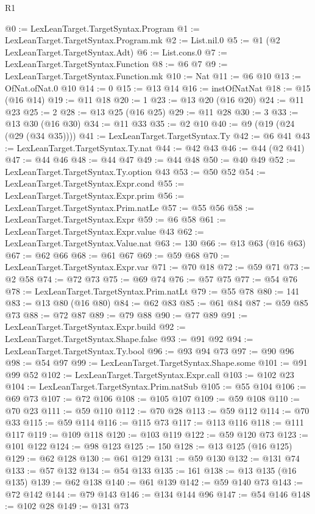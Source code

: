 \begin{lexlean}{R1}
\begin{coremodule}
@0 := LexLeanTarget.TargetSyntax.Program
@1 := LexLeanTarget.TargetSyntax.Program.mk
@2 := List.nil.{0}
@5 := @1 (@2 LexLeanTarget.TargetSyntax.Adt)
@6 := List.cons.{0}
@7 := LexLeanTarget.TargetSyntax.Function
@8 := @6 @7
@9 := LexLeanTarget.TargetSyntax.Function.mk
@10 := Nat
@11 := @6 @10
@13 := OfNat.ofNat.{0} @10
@14 := 0
@15 := @13 @14
@16 := instOfNatNat
@18 := @15 (@16 @14)
@19 := @11 @18
@20 := 1
@23 := @13 @20 (@16 @20)
@24 := @11 @23
@25 := 2
@28 := @13 @25 (@16 @25)
@29 := @11 @28
@30 := 3
@33 := @13 @30 (@16 @30)
@34 := @11 @33
@35 := @2 @10
@40 := @9 (@19 (@24 (@29 (@34 @35))))
@41 := LexLeanTarget.TargetSyntax.Ty
@42 := @6 @41
@43 := LexLeanTarget.TargetSyntax.Ty.nat
@44 := @42 @43
@46 := @44 (@2 @41)
@47 := @44 @46
@48 := @44 @47
@49 := @44 @48
@50 := @40 @49
@52 := LexLeanTarget.TargetSyntax.Ty.option @43
@53 := @50 @52
@54 := LexLeanTarget.TargetSyntax.Expr.cond
@55 := LexLeanTarget.TargetSyntax.Expr.prim
@56 := LexLeanTarget.TargetSyntax.Prim.natLe
@57 := @55 @56
@58 := LexLeanTarget.TargetSyntax.Expr
@59 := @6 @58
@61 := LexLeanTarget.TargetSyntax.Expr.value @43
@62 := LexLeanTarget.TargetSyntax.Value.nat
@63 := 130
@66 := @13 @63 (@16 @63)
@67 := @62 @66
@68 := @61 @67
@69 := @59 @68
@70 := LexLeanTarget.TargetSyntax.Expr.var
@71 := @70 @18
@72 := @59 @71
@73 := @2 @58
@74 := @72 @73
@75 := @69 @74
@76 := @57 @75
@77 := @54 @76
@78 := LexLeanTarget.TargetSyntax.Prim.natLt
@79 := @55 @78
@80 := 141
@83 := @13 @80 (@16 @80)
@84 := @62 @83
@85 := @61 @84
@87 := @59 @85 @73
@88 := @72 @87
@89 := @79 @88
@90 := @77 @89
@91 := LexLeanTarget.TargetSyntax.Expr.build
@92 := LexLeanTarget.TargetSyntax.Shape.false
@93 := @91 @92
@94 := LexLeanTarget.TargetSyntax.Ty.bool
@96 := @93 @94 @73
@97 := @90 @96
@98 := @54 @97
@99 := LexLeanTarget.TargetSyntax.Shape.some
@101 := @91 @99 @52
@102 := LexLeanTarget.TargetSyntax.Expr.call
@103 := @102 @23
@104 := LexLeanTarget.TargetSyntax.Prim.natSub
@105 := @55 @104
@106 := @69 @73
@107 := @72 @106
@108 := @105 @107
@109 := @59 @108
@110 := @70 @23
@111 := @59 @110
@112 := @70 @28
@113 := @59 @112
@114 := @70 @33
@115 := @59 @114
@116 := @115 @73
@117 := @113 @116
@118 := @111 @117
@119 := @109 @118
@120 := @103 @119
@122 := @59 @120 @73
@123 := @101 @122
@124 := @98 @123
@125 := 150
@128 := @13 @125 (@16 @125)
@129 := @62 @128
@130 := @61 @129
@131 := @59 @130
@132 := @131 @74
@133 := @57 @132
@134 := @54 @133
@135 := 161
@138 := @13 @135 (@16 @135)
@139 := @62 @138
@140 := @61 @139
@142 := @59 @140 @73
@143 := @72 @142
@144 := @79 @143
@146 := @134 @144 @96
@147 := @54 @146
@148 := @102 @28
@149 := @131 @73

\end{coremodule}
\end{lexlean}
